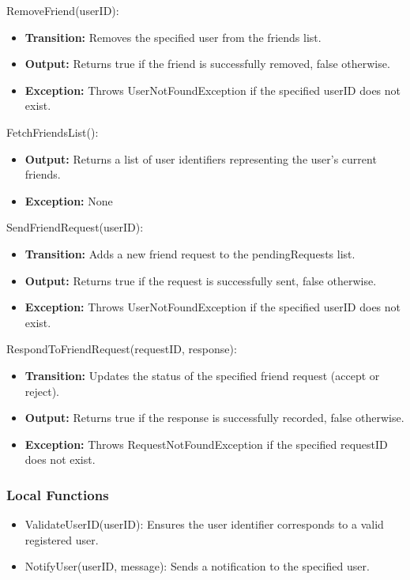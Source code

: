 \documentclass[12pt, titlepage]{article}
\begin{document}
\noindent RemoveFriend(userID):
\begin{itemize}
  \item \textbf{Transition:} Removes the specified user from the friends list.
  \item \textbf{Output:} Returns true if the friend is successfully removed, false otherwise.
  \item \textbf{Exception:} Throws UserNotFoundException if the specified userID does not exist.
\end{itemize}

\noindent FetchFriendsList():
\begin{itemize}
  \item \textbf{Output:} Returns a list of user identifiers representing the user’s current friends.
  \item \textbf{Exception:} None
\end{itemize}

\noindent SendFriendRequest(userID):
\begin{itemize}
  \item \textbf{Transition:} Adds a new friend request to the pendingRequests list.
  \item \textbf{Output:} Returns true if the request is successfully sent, false otherwise.
  \item \textbf{Exception:} Throws UserNotFoundException if the specified userID does not exist.
\end{itemize}

\noindent RespondToFriendRequest(requestID, response):
\begin{itemize}
  \item \textbf{Transition:} Updates the status of the specified friend request (accept or reject).
  \item \textbf{Output:} Returns true if the response is successfully recorded, false otherwise.
  \item \textbf{Exception:} Throws RequestNotFoundException if the specified requestID does not exist.
\end{itemize}

\subsubsection{Local Functions}

\begin{itemize}
  \item ValidateUserID(userID): Ensures the user identifier corresponds to a valid registered user.
  \item NotifyUser(userID, message): Sends a notification to the specified user.
\end{itemize}
\end{document}
